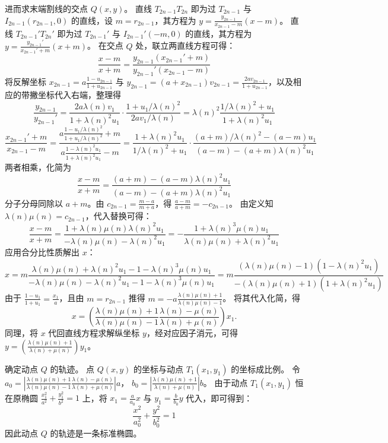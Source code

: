 \begin{solution}
进而求末端割线的交点 $Q(x,y)$。
直线 $T_{2n-1}T_{2n}$ 即为过 $T_{2n-1}$ 与 $I_{2n-1}(r_{2n-1}, 0)$ 的直线，设 $m = r_{2n-1}$，其方程为 $y = \frac{y_{2n-1}}{x_{2n-1} - m}(x - m)$。
直线 $T_{2n-1}'T_{2n}'$ 即为过 $T_{2n-1}'$ 与 $I_{2n-1}'(-m, 0)$ 的直线，其方程为 $y = \frac{y_{2n-1}'}{x_{2n-1}' + m}(x + m)$。
在交点 $Q$ 处，联立两直线方程可得：
$$ \frac{x-m}{x+m} = \frac{y_{2n-1}(x_{2n-1}' + m)}{y_{2n-1}'(x_{2n-1} - m)} $$
将反解坐标 $x_{2n-1} = a\frac{1-u_{2n-1}}{1+u_{2n-1}}$ 与 $y_{2n-1} = (a+x_{2n-1})v_{2n-1} = \frac{2a v_{2n-1}}{1+u_{2n-1}}$，以及相应的带撇坐标代入右端，整理得
$$ \frac{y_{2n-1}}{y_{2n-1}'} = \frac{2a \lambda(n) v_1}{1+\lambda(n)^2 u_1} \cdot \frac{1+u_1/\lambda(n)^2}{2a v_1/\lambda(n)} = \lambda(n)^2 \frac{1/\lambda(n)^2 + u_1}{1+\lambda(n)^2 u_1} $$
$$ \frac{x_{2n-1}' + m}{x_{2n-1} - m} = \frac{ a\frac{1-u_1/\lambda(n)^2}{1+u_1/\lambda(n)^2} + m }{ a\frac{1-\lambda(n)^2 u_1}{1+\lambda(n)^2 u_1} - m } = \frac{1+\lambda(n)^2 u_1}{1/\lambda(n)^2 + u_1} \cdot \frac{ (a+m)/\lambda(n)^2 - (a-m)u_1 }{ (a-m) - (a+m)\lambda(n)^2 u_1 } $$
两者相乘，化简为
$$ \frac{x-m}{x+m} = \frac{ (a+m) - (a-m)\lambda(n)^2 u_1 }{ (a-m) - (a+m)\lambda(n)^2 u_1 } $$
分子分母同除以 $a+m$。由 $c_{2n-1} = \frac{m-a}{m+a}$，得 $\frac{a-m}{a+m} = -c_{2n-1}$。
由定义知 $\lambda(n)\mu(n) = c_{2n-1}$，代入替换可得：
$$ \frac{x-m}{x+m} = \frac{ 1 + \lambda(n)\mu(n) \lambda(n)^2 u_1 }{ - \lambda(n)\mu(n) - \lambda(n)^2 u_1 } = - \frac{ 1 + \lambda(n)^3 \mu(n) u_1 }{ \lambda(n)\mu(n) + \lambda(n)^2 u_1 } $$
应用合分比性质解出 $x$：
$$ x = m \frac{ \lambda(n)\mu(n) + \lambda(n)^2 u_1 - 1 - \lambda(n)^3 \mu(n) u_1 }{ -\lambda(n)\mu(n) - \lambda(n)^2 u_1 - 1 - \lambda(n)^3 \mu(n) u_1 } = m \frac{ (\lambda(n)\mu(n) - 1)(1 - \lambda(n)^2 u_1) }{ -(\lambda(n)\mu(n) + 1)(1 + \lambda(n)^2 u_1) } $$
由于 $\frac{1-u_1}{1+u_1} = \frac{x_1}{a}$，且由 $m = r_{2n-1}$ 推得 $m = -a\frac{\lambda(n)\mu(n)+1}{\lambda(n)\mu(n)-1}$。
将其代入化简，得
$$x = \left( \frac{\lambda(n)\mu(n)+1}{\lambda(n)\mu(n)-1} \frac{\lambda(n)-\mu(n)}{\lambda(n)+\mu(n)} \right) x_1.$$
同理，将 $x$ 代回直线方程求解纵坐标 $y$，经对应因子消元，可得 $y = \left( \frac{\lambda(n)\mu(n)+1}{\lambda(n)+\mu(n)} \right) y_1$。

确定动点 $Q$ 的轨迹。
点 $Q(x,y)$ 的坐标与动点 $T_1(x_1,y_1)$ 的坐标成比例。
令 $a_0 = \left| \frac{\lambda(n)\mu(n)+1}{\lambda(n)\mu(n)-1} \frac{\lambda(n)-\mu(n)}{\lambda(n)+\mu(n)} \right| a$， $b_0 = \left| \frac{\lambda(n)\mu(n)+1}{\lambda(n)+\mu(n)} \right| b$。
由于动点 $T_1(x_1, y_1)$ 恒在原椭圆 $\frac{x_1^2}{a^2} + \frac{y_1^2}{b^2} = 1$ 上，将 $x_1 = \frac{a}{a_0}x$ 与 $y_1 = \frac{b}{b_0}y$ 代入，即可得到：
$$ \frac{x^2}{a_0^2} + \frac{y^2}{b_0^2} = 1 $$
因此动点 $Q$ 的轨迹是一条标准椭圆。
\end{solution}


